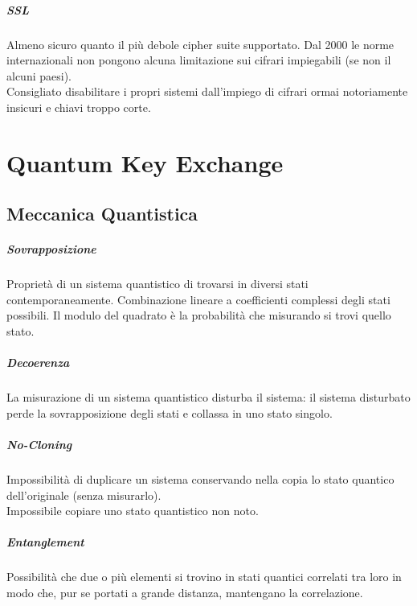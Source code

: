 \documentclass[10pt]{book}
\begin{document}
\paragraph{SSL} Almeno sicuro quanto il più debole cipher suite supportato. Dal 2000 le norme internazionali non pongono alcuna limitazione sui cifrari impiegabili (se non il alcuni paesi).\\
Consigliato disabilitare i propri sistemi dall'impiego di cifrari ormai notoriamente insicuri e chiavi troppo corte.
\chapter{Quantum Key Exchange}
\section{Meccanica Quantistica}
\paragraph{Sovrapposizione} Proprietà di un sistema quantistico di trovarsi in diversi stati contemporaneamente. Combinazione lineare a coefficienti complessi degli stati possibili. Il modulo del quadrato è la probabilità che misurando si trovi quello stato.
\paragraph{Decoerenza} La misurazione di un sistema quantistico disturba il sistema: il sistema disturbato perde la sovrapposizione degli stati e collassa in uno stato singolo.
\paragraph{No-Cloning} Impossibilità di duplicare un sistema conservando nella copia lo stato quantico dell'originale (senza misurarlo).\\
Impossibile copiare uno stato quantistico non noto.
\paragraph{Entanglement} Possibilità che due o più elementi si trovino in stati quantici correlati tra loro in modo che, pur se portati a grande distanza, mantengano la correlazione.
\end{document}
